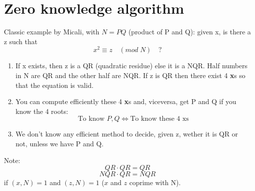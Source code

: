 \documentclass[a4paper, 10pt, titlepage]{article}
\begin{document}
\newpage
\section{Zero knowledge algorithm}
Classic example by Micali, with $N=PQ$ (product of P and Q): given x, is there a z such that
$$x^2 \equiv z \quad (mod \; N) \quad ?$$
\begin{enumerate}
\item If x exists, then z is a QR (quadratic residue) else it is a NQR. Half numbers in N are QR and the other half are NQR. If z is QR then there exist 4 \textbf{x}s so that the equation is valid.
\item You can compute efficiently these 4 \textbf{x}s and, viceversa, get P and Q if you know the 4 roots:
$$\text{To know } P, Q \iff \text{To know these 4 xs}$$
\item We don't know any efficient method to decide, given z, wether it is QR or not, unless we have P and Q.
\end{enumerate}
Note: 
$$QR \cdot QR = QR$$
$$NQR \cdot QR = NQR$$
if $(x,N) = 1$ and $(z,N) = 1$ ($x$ and $z$ coprime with N).
\end{document}
